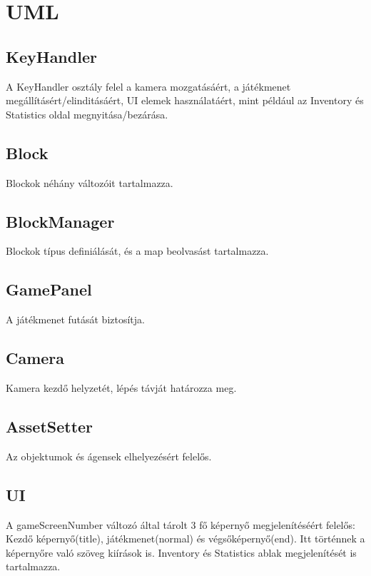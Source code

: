 


\section{UML}

\subsection{KeyHandler}

A KeyHandler osztály felel a kamera mozgatásáért, a játékmenet megállításért/elinditásáért, UI elemek használatáért, 
mint például az Inventory és Statistics oldal megnyitása/bezárása.

\subsection{Block}

Blockok néhány változóit tartalmazza.

\subsection{BlockManager}

Blockok típus definiálását, és a map beolvasást tartalmazza.

\subsection{GamePanel}

A játékmenet futását biztosítja.

\subsection{Camera}

Kamera kezdő helyzetét, lépés távját határozza meg.

\subsection{AssetSetter}

Az objektumok és ágensek elhelyezésért felelős.

\subsection{UI}

A gameScreenNumber változó által tárolt 3 fő képernyő megjelenítéséért felelős: Kezdő képernyő(title),
játékmenet(normal) és végsőképernyő(end).
Itt történnek a képernyőre való szöveg kiírások is.
Inventory és Statistics ablak megjelenítését is tartalmazza.

